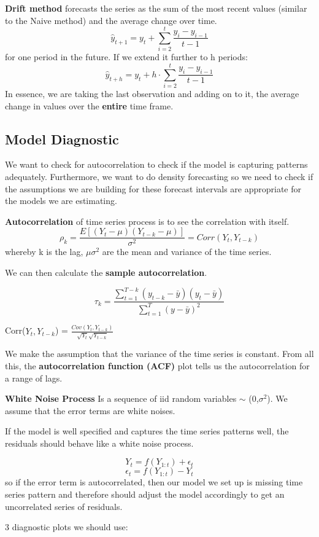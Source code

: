 \documentclass[11pt, oneside]{article}
\theoremstyle{definition}
\begin{document}
\textbf{Drift method} forecasts the series as the sum of the most recent values (similar to the Naive method) and the average change over time.
$$
\hat{y}_{t+1} = y_t + \sum\limits_{i=2}^t\frac{y_i-y_{i-1}}{t-1}
$$
for one period in the future. If we extend it further to h periods:
$$
\hat{y}_{t+h} = y_t + h\cdot \sum\limits_{i=2}^t\frac{y_i-y_{i-1}}{t-1}
$$
In essence, we are taking the last observation and adding on to it, the average change in values over the \textbf{entire} time frame.

\subsection{Model Diagnostic}
We want to check for autocorrelation to check if the model is capturing patterns adequately. Furthermore, we want to do density forecasting so we need to check if the assumptions we are building for these forecast intervals are appropriate for the models we are estimating.

\textbf{Autocorrelation} of time series process is to see the correlation with itself.
$$
\rho_k = \frac{E[(Y_t - \mu)(Y_{t-k} - \mu)]}{\sigma^2} = Corr(Y_t,Y_{t-k})
$$
whereby k is the lag, $\mu \sigma^2$ are the mean and variance of the time series.

We can then calculate the \textbf{sample autocorrelation}.

$$
\tau_k = \frac{\sum\limits_{t=1}^{T-k}(y_{t-k}-\bar{y})(y_t - \bar{y})}{\sum\limits_{t=1}^{T}(y-\bar{y})^2}
$$

Corr($Y_t,Y_{t-k}$) = $\frac{Cov(Y_t,Y_{t-k})}{\sqrt{Y_t}\sqrt{Y_{t-k}}}$

We make the assumption that the variance of the time series is constant. From all this, the \textbf{autocorrelation function (ACF)} plot tells us the autocorrelation for a range of lags.

\textbf{White Noise Process} Is a sequence of iid random variables $\sim$ (0,$\sigma^2$). We assume that the error terms are white noises.

If the model is well specified and captures the time series patterns well, the residuals should behave like a white noise process.

$$
Y_t = f(Y_{1:t}) + \epsilon_t
$$
$$
\epsilon_t = f(Y_{1:t}) - Y_t
$$
so if the error term is autocorrelated, then our model we set up is missing time series pattern and therefore should adjust the model accordingly to get an uncorrelated series of residuals.

3 diagnostic plots we should use:
\end{document}
